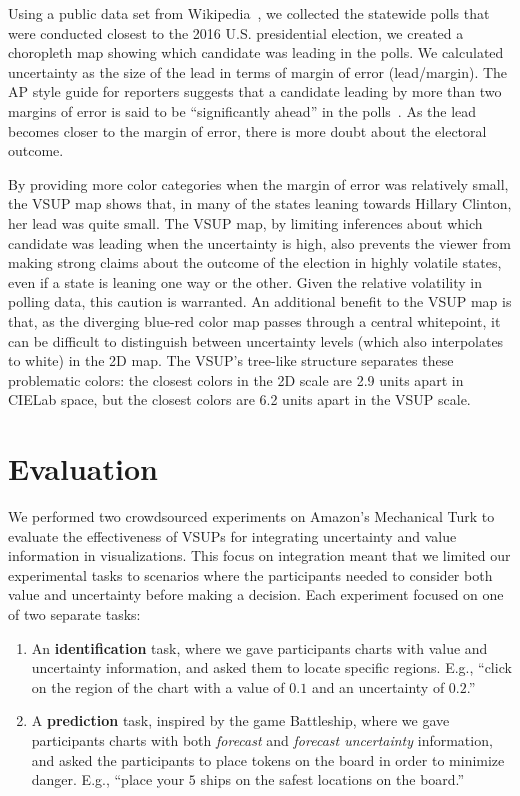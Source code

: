 Using a public data set from Wikipedia~\cite{wiki}, we collected the statewide polls that were conducted closest to the 2016 U.S. presidential election, we created a choropleth map showing which candidate was leading in the polls. We calculated uncertainty as the size of the lead in terms of margin of error (lead/margin). The AP style guide for reporters suggests that a candidate leading by more than two margins of error is said to be ``significantly ahead'' in the polls~\cite{french1988associated}. As the lead becomes closer to the margin of error, there is more doubt about the electoral outcome.

By providing more color categories when the margin of error was relatively small, the VSUP map shows that, in many of the states leaning towards Hillary Clinton, her lead was quite small. The VSUP map, by limiting inferences about which candidate was leading when the uncertainty is high, also prevents the viewer from making strong claims about the outcome of the election in highly volatile states, even if a state is leaning one way or the other. Given the relative volatility in polling data, this caution is warranted. An additional benefit to the VSUP map is that, as the diverging blue-red color map passes through a central whitepoint, it can be difficult to distinguish between uncertainty levels (which also interpolates to white) in the 2D map. The VSUP's tree-like structure separates these problematic colors: the closest colors in the 2D scale are 2.9 units apart in CIELab space, but the closest colors are 6.2 units apart in the VSUP scale.

\section{Evaluation}
\conditionFig

We performed two crowdsourced experiments on Amazon's Mechanical Turk to evaluate the effectiveness of VSUPs for integrating uncertainty and value information in visualizations. This focus on integration meant that we limited our experimental tasks to scenarios where the participants needed to consider both value and uncertainty before making a decision. Each experiment focused on one of two separate tasks:

\begin{enumerate}
	\item An \textbf{identification} task, where we gave participants charts with value and uncertainty information, and asked them to locate specific regions. E.g., ``click on the region of the chart with a value of $0.1$ and an uncertainty of $0.2$.''
	\item A \textbf{prediction} task, inspired by the game Battleship, where we gave participants charts with both \emph{forecast} and \emph{forecast uncertainty} information, and asked the participants to place tokens on the board in order to minimize danger. E.g., ``place your $5$ ships on the safest locations on the board.''
\end{enumerate}

